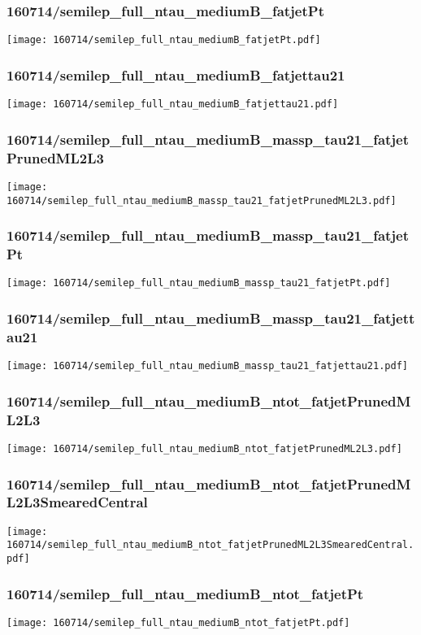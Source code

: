 \begin{frame}
   \frametitle{\small 160714/semilep\_full\_ntau\_mediumB\_fatjetPt}
   \centering
   \texttt{[image: 160714/semilep\_full\_ntau\_mediumB\_fatjetPt.pdf]}
\end{frame}

\begin{frame}
   \frametitle{\small 160714/semilep\_full\_ntau\_mediumB\_fatjettau21}
   \centering
   \texttt{[image: 160714/semilep\_full\_ntau\_mediumB\_fatjettau21.pdf]}
\end{frame}

\begin{frame}
   \frametitle{\small 160714/semilep\_full\_ntau\_mediumB\_massp\_tau21\_fatjetPrunedML2L3}
   \centering
   \texttt{[image: 160714/semilep\_full\_ntau\_mediumB\_massp\_tau21\_fatjetPrunedML2L3.pdf]}
\end{frame}

\begin{frame}
   \frametitle{\small 160714/semilep\_full\_ntau\_mediumB\_massp\_tau21\_fatjetPt}
   \centering
   \texttt{[image: 160714/semilep\_full\_ntau\_mediumB\_massp\_tau21\_fatjetPt.pdf]}
\end{frame}

\begin{frame}
   \frametitle{\small 160714/semilep\_full\_ntau\_mediumB\_massp\_tau21\_fatjettau21}
   \centering
   \texttt{[image: 160714/semilep\_full\_ntau\_mediumB\_massp\_tau21\_fatjettau21.pdf]}
\end{frame}

\begin{frame}
   \frametitle{\small 160714/semilep\_full\_ntau\_mediumB\_ntot\_fatjetPrunedML2L3}
   \centering
   \texttt{[image: 160714/semilep\_full\_ntau\_mediumB\_ntot\_fatjetPrunedML2L3.pdf]}
\end{frame}

\begin{frame}
   \frametitle{\small 160714/semilep\_full\_ntau\_mediumB\_ntot\_fatjetPrunedML2L3SmearedCentral}
   \centering
   \texttt{[image: 160714/semilep\_full\_ntau\_mediumB\_ntot\_fatjetPrunedML2L3SmearedCentral.pdf]}
\end{frame}

\begin{frame}
   \frametitle{\small 160714/semilep\_full\_ntau\_mediumB\_ntot\_fatjetPt}
   \centering
   \texttt{[image: 160714/semilep\_full\_ntau\_mediumB\_ntot\_fatjetPt.pdf]}
\end{frame}

